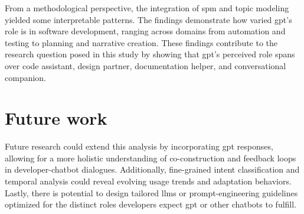From a methodological perspective, the integration of \acrshort{spm} and topic modeling yielded some interpretable patterns. The findings demonstrate how varied \acrshort{gpt}'s role is in software development, ranging across domains from automation and testing to planning and narrative creation. These findings contribute to the research question posed in this study by showing that \acrshort{gpt}'s perceived role spans over code assistant, design partner, documentation helper, and conversational companion.

\section{Future work}
Future research could extend this analysis by incorporating \acrshort{gpt} responses, allowing for a more holistic understanding of co-construction and feedback loops in developer-chatbot dialogues. Additionally, fine-grained intent classification and temporal analysis could reveal evolving usage trends and adaptation behaviors. Lastly, there is potential to design tailored \acrlong{llm}s or prompt-engineering guidelines optimized for the distinct roles developers expect \acrshort{gpt} or other chatbots to fulfill.